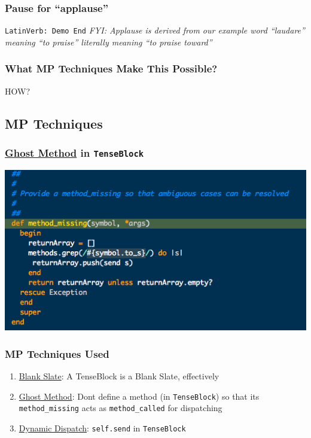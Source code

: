 \documentclass[slidestop,compress,mathserif]{beamer}
\begin{document}
\begin{frame}
	\frametitle{Pause for ``applause''}
	\begin{center}
		\texttt{LatinVerb:  Demo End}
		\vskip 0.5cm
		\emph{FYI:  Applause is derived from our example word ``laudare'' meaning ``to praise'' literally meaning ``to praise toward''}
	\end{center}	
\end{frame}




\begin{frame}
	\frametitle{What MP Techniques Make This Possible?}
	\begin{center}
		HOW?
	\end{center}
	
\end{frame}


\subsection{MP Techniques} %
\label{sub:methods}

\begin{frame}
	\frametitle{\underline{Ghost Method} in \texttt{TenseBlock}}
	\includegraphics[scale=0.45]{img/tenseblock_mm.png}
\end{frame}

\begin{frame}
	\frametitle{MP Techniques Used}
	\begin{enumerate}
		\item \underline{Blank Slate}:  A TenseBlock is a Blank Slate, effectively
		\item \underline{Ghost Method}:  Dont define a method (in \texttt{TenseBlock}) so that its \texttt{method\_missing} acts as \texttt{method\_called} for dispatching
		\item \underline{Dynamic Dispatch}:  \texttt{self.send} in \texttt{TenseBlock}
	\end{enumerate}
\end{frame}
\end{document}
